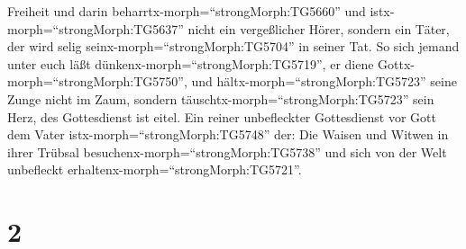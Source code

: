 Freiheit und darin beharrtx-morph=``strongMorph:TG5660'' und
istx-morph=``strongMorph:TG5637'' nicht ein vergeßlicher Hörer, sondern
ein Täter, der wird selig seinx-morph=``strongMorph:TG5704'' in seiner
Tat.  So sich jemand unter euch läßt
dünkenx-morph=``strongMorph:TG5719'', er diene
Gottx-morph=``strongMorph:TG5750'', und
hältx-morph=``strongMorph:TG5723'' seine Zunge nicht im Zaum, sondern
täuschtx-morph=``strongMorph:TG5723'' sein Herz, des Gottesdienst ist
eitel.  Ein reiner unbefleckter Gottesdienst vor Gott dem
Vater istx-morph=``strongMorph:TG5748'' der: Die Waisen und Witwen in
ihrer Trübsal besuchenx-morph=``strongMorph:TG5738'' und sich von der
Welt unbefleckt erhaltenx-morph=``strongMorph:TG5721''.

\hypertarget{section-1}{%
\section{2}\label{section-1}}


